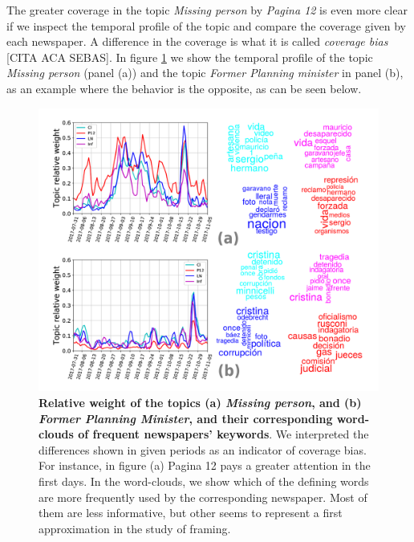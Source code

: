 \documentclass[a4paper, 12pt]{article}
\begin{document}

\par The greater coverage in the topic \emph{Missing person} by \emph{Pagina 12} is even more clear if we inspect the temporal profile of the topic and compare the coverage given by each newspaper. A difference in the coverage is what it is called \emph{coverage bias} [CITA ACA SEBAS].  In figure \ref{fig:topics_temporal_profiles} we show the temporal profile of the topic \emph{Missing person} (panel (a)) and the topic \emph{Former Planning minister} in panel (b), as an example where the behavior is the opposite, as can be seen below.

\begin{figure}[h]
\centering
\includegraphics[width = \textwidth]{images/Fig7.pdf}
\caption{\textbf{Relative weight of the topics (a) \emph{Missing person}, and (b) \emph{Former Planning Minister}, and their corresponding word-clouds of frequent newspapers' keywords}. We interpreted the differences shown in given periods as an indicator of coverage bias. For instance, in figure (a) Pagina 12 pays a greater attention in the first days. In the word-clouds, we show which of the defining words are more frequently used by the corresponding newspaper. Most of them are less informative, but other seems to represent a first approximation in the study of framing.}
\label{fig:topics_temporal_profiles}
\end{figure}
\end{document}
